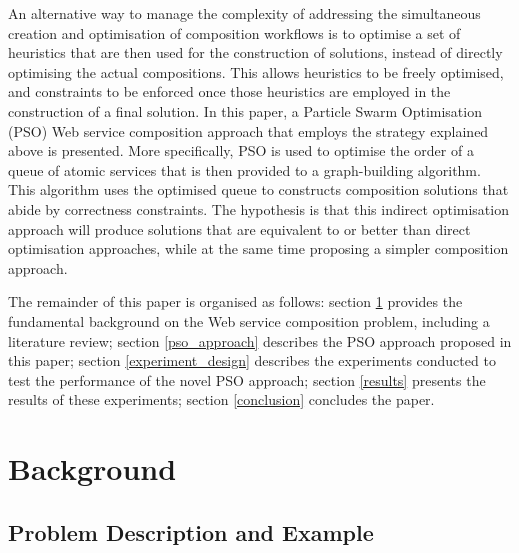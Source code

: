 \documentclass{llncs}
\begin{document}
An alternative way to manage the complexity of addressing the simultaneous creation and optimisation of composition workflows is to optimise a set of heuristics that are then used for the construction of solutions, instead of directly optimising the actual compositions. This allows heuristics to be freely optimised, and constraints to be enforced once those heuristics are employed in the construction of a final solution. In this paper, a Particle Swarm Optimisation (PSO) \cite{eberhart2001particle} Web service composition approach that employs the strategy explained above is presented. More specifically, PSO is used to optimise the order of a queue of atomic services that is then provided to a graph-building algorithm. This algorithm uses the optimised queue to constructs composition solutions that abide by correctness constraints. The hypothesis is that this indirect optimisation approach will produce solutions that are equivalent to or better than direct optimisation approaches, while at the same time proposing a simpler composition approach.

The remainder of this paper is organised as follows: section \ref{background} provides the fundamental background on the Web service composition problem, including a literature review; section \ref{pso_approach} describes the PSO approach proposed in this paper; section \ref{experiment_design} describes the experiments conducted to test the performance of the novel PSO approach; section \ref{results} presents the results of these experiments; section \ref{conclusion} concludes the paper.

\section{Background}\label{background}

\subsection{Problem Description and Example}
\end{document}

